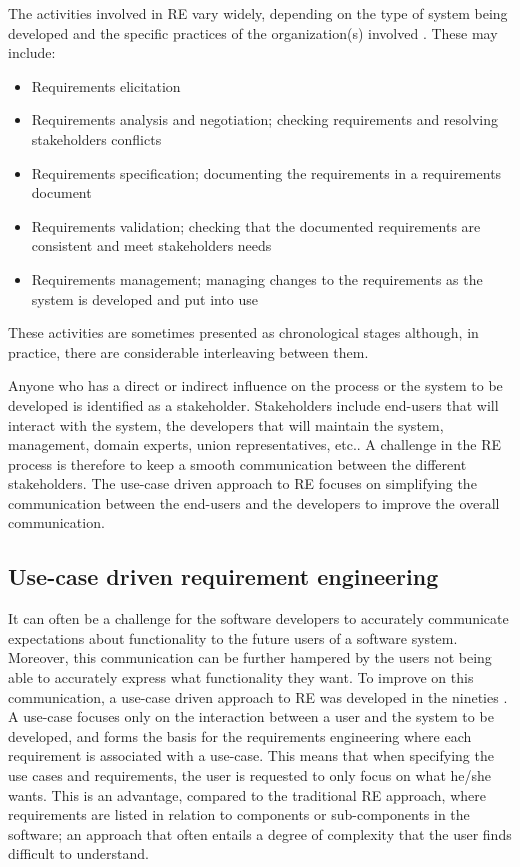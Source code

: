 The activities involved in RE vary widely, depending on the type of system being developed and the specific practices of the organization(s) involved  \cite{Som11}.  These may include:
\begin{itemize}
\item Requirements elicitation 
\item Requirements analysis and negotiation; checking requirements and resolving stakeholders conflicts
\item Requirements specification; documenting the requirements in a requirements document
\item Requirements validation; checking that the documented requirements are consistent and meet stakeholders needs
\item Requirements management; managing changes to the requirements as the system is developed and put into use
\end{itemize}

These activities are sometimes presented as chronological stages although, in practice, there  are considerable interleaving between them.  

Anyone who has a direct or indirect influence on the process or the system to be developed is identified as a stakeholder.   Stakeholders include end-users that will interact with the system, the developers that will maintain the system, management, domain experts, union representatives, etc..  A challenge in the RE process is therefore to keep a smooth communication between the different stakeholders.  The use-case driven approach to RE focuses on simplifying the communication between the end-users and the developers to improve the overall communication.

\subsection{Use-case driven requirement engineering}
\label{sec:use-case-driven}
It can often be a challenge for the software developers to accurately communicate expectations about functionality to the
future users of a software system. Moreover, this communication can be further hampered by the users not
being able to accurately express what functionality they want. To improve on this communication, a use-case driven
approach to RE was developed in the
nineties  \cite{Jac92,Poh10,Coc01}.  A use-case focuses only on the interaction between a user and the system to be
developed, and forms the basis for the requirements engineering where each requirement is
associated with a use-case. This means that when specifying the use cases and requirements, the user is requested to only focus on what he/she wants.  This is an
advantage, compared to the traditional RE approach, where requirements are listed in relation to
components or sub-components in
the software; an approach that often entails a degree of complexity that the user finds difficult to understand.  

